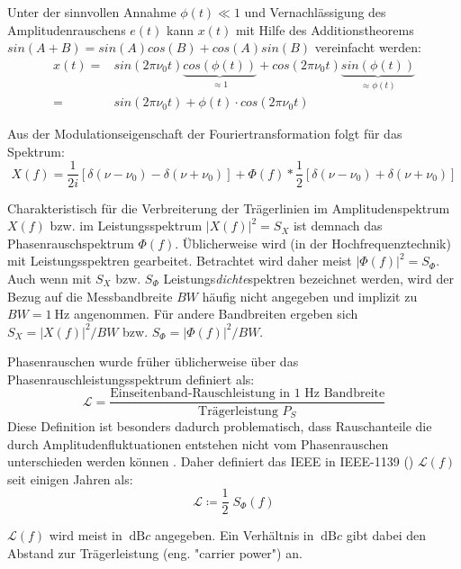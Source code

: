 Unter der sinnvollen Annahme $\phi(t)\ll1$ und Vernachlässigung des Amplitudenrauschens $e(t)$ kann $x(t)$ mit Hilfe des Additionstheorems $sin(A+B) = sin(A)cos(B) + cos(A)sin(B)$ vereinfacht werden:
\begin{align}
	x(t) =& sin\left(2\pi \nu_0 t \right) \underbrace{cos(\phi(t))}_{\approx 1} + cos\left(2\pi \nu_0 t \right) \underbrace{sin(\phi(t))}_{\approx \phi(t)} \\
	=& sin\left(2\pi \nu_0 t \right) + \phi(t) \cdot cos\left(2\pi \nu_0 t \right)
\end{align}

Aus der Modulationseigenschaft der Fouriertransformation folgt für das Spektrum:
\begin{equation}
	X(f) = \frac{1}{2 i} \left[ \delta(\nu-\nu_0) - \delta(\nu+\nu_0) \right] + \Phi(f) * \frac{1}{2} \left[ \delta(\nu-\nu_0) + \delta(\nu+\nu_0) \right]
\end{equation}

Charakteristisch für die Verbreiterung der Trägerlinien im Amplitudenspektrum $X(f)$ bzw. im Leistungsspektrum $|X(f)|^2=S_X$ ist demnach das Phasenrauschspektrum $\Phi(f)$. Üblicherweise wird (in der Hochfrequenztechnik) mit Leistungsspektren gearbeitet. Betrachtet wird daher meist $|\Phi(f)|^2=S_\Phi$. Auch wenn mit $S_X$ bzw. $S_\Phi$ Leistungs\textit{dichte}spektren bezeichnet werden, wird der Bezug auf die Messbandbreite $BW$ häufig nicht angegeben und implizit zu $BW=\SI{1}{\hertz}$ angenommen. Für andere Bandbreiten ergeben sich $S_X=|X(f)|^2/BW$ bzw. $S_\Phi=|\Phi(f)|^2/BW$.

Phasenrauschen wurde früher üblicherweise über das Phasenrauschleistungsspektrum definiert als:
\begin{equation}
\label{eq:Lalt}
	\mathscr{L} = \frac{\text{Einseitenband-Rauschleistung in 1 Hz Bandbreite}}{\text{Trägerleistung } P_S}
\end{equation}
Diese Definition ist besonders dadurch problematisch, dass Rauschanteile die durch Amplitudenfluktuationen entstehen nicht vom Phasenrauschen unterschieden werden können \cite{Rubiola2008}. Daher definiert das IEEE in IEEE-1139 (\cite{IEEErandom}) $\mathscr{L}(f)$ seit einigen Jahren als:
\begin{equation}
\label{eq:Lneu}
	\mathscr{L} \coloneqq \frac{1}{2} \; S_\Phi(f)
\end{equation}

$\mathscr{L}(f)$ wird meist in $\SI{}{\dB c}$ angegeben. Ein Verhältnis in $\SI{}{\dB c}$ gibt dabei den Abstand zur Trägerleistung (eng. "carrier power") an.

